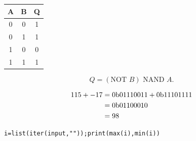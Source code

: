 \documentclass{article}
\begin{document}
\begin{center}\begin{tabular}{| c | c | c |}
    \hline
    A & B & Q \\
    \hline
    0 & 0 & 1 \\
    0 & 1 & 1 \\
    1 & 0 & 0 \\
    1 & 1 & 1 \\
    \hline
\end{tabular}\end{center}

$$Q = (\text{NOT } B) \text{ NAND } A.$$

\newpage{}

    \begin{align*}
        115 + -17 &= 0\text b01110011 +
                     0\text b11101111 \\
                  &= 0\text b01100010 \\
                  &= 98
    \end{align*}

\newpage{}
\begin{verbatim}i=list(iter(input,""));print(max(i),min(i))
\end{verbatim}
\end{document}
